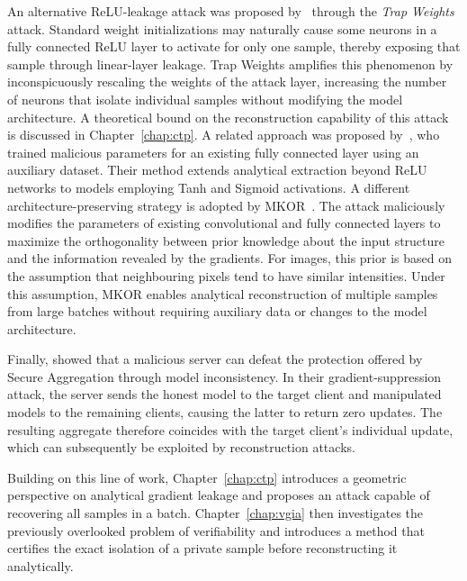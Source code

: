 An alternative ReLU-leakage attack was proposed by~ through the \emph{Trap Weights} attack. Standard weight initializations may naturally cause some neurons in a fully connected ReLU layer to activate for only one sample, thereby exposing
that sample through linear-layer leakage. Trap Weights amplifies this
phenomenon by inconspicuously rescaling the weights of the attack layer,
increasing the number of neurons that isolate individual samples without
modifying the model architecture. A theoretical bound on the
reconstruction capability of this attack is discussed in
Chapter~\ref{chap:ctp}. A related approach was proposed
by~, who trained malicious parameters for an
existing fully connected layer using an auxiliary dataset. Their method
extends analytical extraction beyond ReLU networks to models employing
Tanh and Sigmoid activations. A different architecture-preserving strategy is adopted by
MKOR~\cite{wangMaximumKnowledgeOrthogonality2024}. The attack
maliciously modifies the parameters of existing convolutional and fully
connected layers to maximize the orthogonality between prior knowledge
about the input structure and the information revealed by the gradients.
For images, this prior is based on the assumption that neighbouring
pixels tend to have similar intensities. Under this assumption, MKOR
enables analytical reconstruction of multiple samples from large
batches without requiring auxiliary data or changes to the model
architecture.

Finally,  showed that a malicious server can defeat the protection offered by Secure Aggregation through model inconsistency. In their gradient-suppression attack, the server sends the honest model to the target client and manipulated models to the remaining clients, causing the latter to return zero updates. The resulting aggregate therefore coincides with the target client's individual update, which can subsequently be exploited by reconstruction attacks.

Building on this line of work, Chapter~\ref{chap:ctp} introduces a
geometric perspective on analytical gradient leakage and proposes an
attack capable of recovering all samples in a batch. Chapter~\ref{chap:vgia} then
investigates the previously overlooked problem of verifiability and
introduces a method that certifies the exact isolation of a private
sample before reconstructing it analytically.




